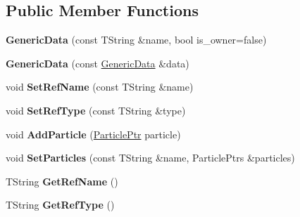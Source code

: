 \subsection*{Public Member Functions}
\begin{DoxyCompactItemize}
\item 
\hypertarget{class_h_a_l_1_1_generic_data_ab2966008650b9dd6268688b26efac4ca}{{\bfseries Generic\+Data} (const T\+String \&name, bool is\+\_\+owner=false)}\label{class_h_a_l_1_1_generic_data_ab2966008650b9dd6268688b26efac4ca}

\item 
\hypertarget{class_h_a_l_1_1_generic_data_a0fc1d60fb890078bc42110602aad77a4}{{\bfseries Generic\+Data} (const \hyperlink{class_h_a_l_1_1_generic_data}{Generic\+Data} \&data)}\label{class_h_a_l_1_1_generic_data_a0fc1d60fb890078bc42110602aad77a4}

\item 
\hypertarget{class_h_a_l_1_1_generic_data_abbc23d840eb192ab59fb01645ae33d51}{void {\bfseries Set\+Ref\+Name} (const T\+String \&name)}\label{class_h_a_l_1_1_generic_data_abbc23d840eb192ab59fb01645ae33d51}

\item 
\hypertarget{class_h_a_l_1_1_generic_data_a3a19cd023aa97a81882f04e633fedbe5}{void {\bfseries Set\+Ref\+Type} (const T\+String \&type)}\label{class_h_a_l_1_1_generic_data_a3a19cd023aa97a81882f04e633fedbe5}

\item 
\hypertarget{class_h_a_l_1_1_generic_data_aca471249ad858ca39c41c66aa505ccb7}{void {\bfseries Add\+Particle} (\hyperlink{class_h_a_l_1_1_generic_particle}{Particle\+Ptr} particle)}\label{class_h_a_l_1_1_generic_data_aca471249ad858ca39c41c66aa505ccb7}

\item 
\hypertarget{class_h_a_l_1_1_generic_data_ac706724c448857289357f788eff350d7}{void {\bfseries Set\+Particles} (const T\+String \&name, Particle\+Ptrs \&particles)}\label{class_h_a_l_1_1_generic_data_ac706724c448857289357f788eff350d7}

\item 
\hypertarget{class_h_a_l_1_1_generic_data_a91b0d760e71de318a15b02bb8492035a}{T\+String {\bfseries Get\+Ref\+Name} ()}\label{class_h_a_l_1_1_generic_data_a91b0d760e71de318a15b02bb8492035a}

\item 
\hypertarget{class_h_a_l_1_1_generic_data_a4ed8d5cf423876674eddd941e5c93890}{T\+String {\bfseries Get\+Ref\+Type} ()}\label{class_h_a_l_1_1_generic_data_a4ed8d5cf423876674eddd941e5c93890}


\end{DoxyCompactItemize}

